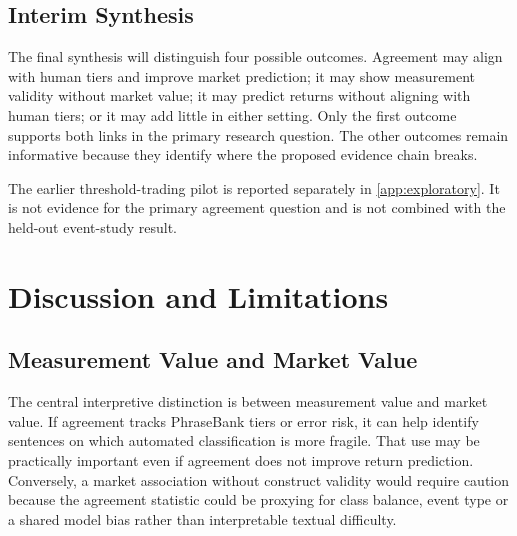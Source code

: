 \documentclass[11pt,a4paper,oneside]{book}
\newif\ifshowdraftnotes
\newcommand{\draftnote}[1]{%
  \ifshowdraftnotes
    \par\smallskip
    \noindent{\color{draftgrey}\small\itshape Drafting note: #1\par}
    \smallskip
  \fi
}
\begin{document}
\draftnote{Insert the registered \texttt{lseg-agreement-event-study-v1} comparison, bootstrap interval, robustness results and a direct answer to Supporting Question 2. Report a null result plainly if the interval does not support incremental predictive value.}

\section{Interim Synthesis}
\label{sec:results-synthesis}

The final synthesis will distinguish four possible outcomes.
Agreement may align with human tiers and improve market prediction; it may show measurement validity without market value; it may predict returns without aligning with human tiers; or it may add little in either setting.
Only the first outcome supports both links in the primary research question.
The other outcomes remain informative because they identify where the proposed evidence chain breaks.

The earlier threshold-trading pilot is reported separately in \cref{app:exploratory}.
It is not evidence for the primary agreement question and is not combined with the held-out event-study result.

\chapter{Discussion and Limitations}
\label{ch:discussion}

\section{Measurement Value and Market Value}
\label{sec:discussion-measurement-market}

The central interpretive distinction is between measurement value and market value.
If agreement tracks PhraseBank tiers or error risk, it can help identify sentences on which automated classification is more fragile.
That use may be practically important even if agreement does not improve return prediction.
Conversely, a market association without construct validity would require caution because the agreement statistic could be proxying for class balance, event type or a shared model bias rather than interpretable textual difficulty.

\draftnote{After the result freeze, state which links are supported, quantify their magnitude and compare them directly with the expectations developed in \cref{ch:literature}.}
\end{document}
